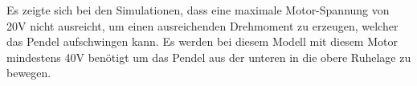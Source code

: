 Es zeigte sich bei den Simulationen, dass eine maximale Motor-Spannung von 20V nicht ausreicht, um einen ausreichenden Drehmoment zu erzeugen, welcher das Pendel aufschwingen kann. Es werden bei diesem Modell mit diesem Motor mindestens 40V benötigt um das Pendel aus der unteren in die obere Ruhelage zu bewegen.
